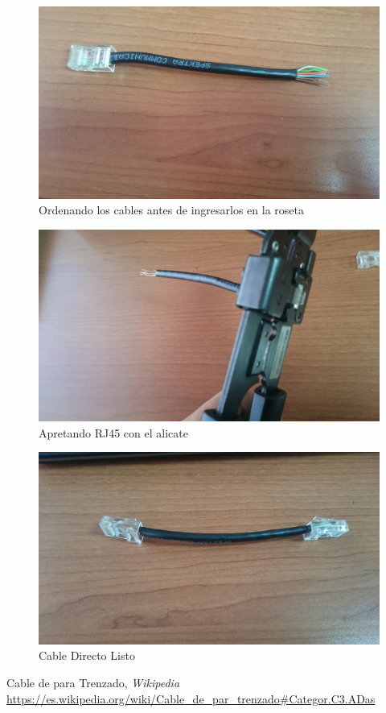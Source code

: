 \documentclass[onecolumn,11pts]{IEEEtran}
\begin{document}
\begin{figure}[h!]
\centering
\includegraphics[scale=0.04]{DSC_0636}
\caption{Ordenando los cables antes de ingresarlos en la roseta}
\label{fig:DSC_0636}
\end{figure}



\begin{figure}[h!]
\centering
\includegraphics[scale=0.04]{DSC_0632}
\caption{Apretando RJ45 con el alicate}
\label{fig:DSC_0632}
\end{figure}

\begin{figure}[h!]
\centering
\includegraphics[scale=0.04]{DSC_0634}
\caption{Cable Directo Listo}
\label{fig:DSC_0634}
\end{figure}  



\clearpage

\begin{thebibliography}{15}

  Cable de para Trenzado,
  \emph{Wikipedia}
  \url{https://es.wikipedia.org/wiki/Cable_de_par_trenzado#Categor.C3.ADas}
  

\end{thebibliography}
\end{document}
